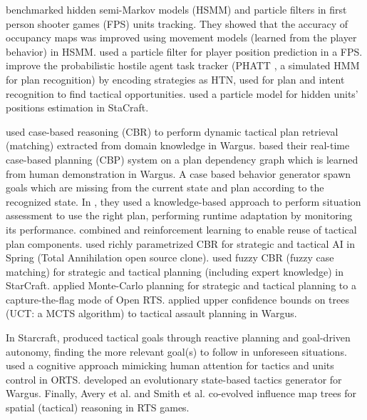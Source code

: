\cite{Hladky_anevaluation} benchmarked hidden semi-Markov models (HSMM) and particle filters in first person shooter games (FPS) units tracking. They showed that the accuracy of occupancy maps was improved using movement models (learned from the player behavior) in HSMM. \cite{particlefiltergameAI} used a particle filter for player position prediction in a FPS. \cite{Kabanza2010} improve the probabilistic hostile agent task tracker (PHATT \citep{PHATT}, a simulated HMM for plan recognition) by encoding strategies as HTN, used for plan and intent recognition to find tactical opportunities. \cite{weber2011aiide} used a particle model for hidden units' positions estimation in StaCraft.

\cite{LTW} used case-based reasoning (CBR) to perform dynamic tactical plan retrieval (matching) extracted from domain knowledge in Wargus. \cite{Ontanon2007} based their real-time case-based planning (CBP) system on a plan dependency graph which is learned from human demonstration in Wargus. A case based behavior generator spawn goals which are missing from the current state and plan according to the recognized state. In \citep{Mishra2008,metalevelbehavioradaptrts}, they used a knowledge-based approach to perform situation assessment to use the right plan, performing runtime adaptation by monitoring its performance. \cite{CBR-RL} combined  and reinforcement learning to enable reuse of tactical plan components. 
\cite{Bakkes09} used richly parametrized CBR for strategic and tactical AI in Spring (Total Annihilation open source clone). 
\cite{CadenaG11} used fuzzy CBR (fuzzy case matching) for strategic and tactical planning (including expert knowledge) in StarCraft. \cite{Chung05} applied Monte-Carlo planning for strategic and tactical planning to a capture-the-flag mode of Open RTS. \cite{UCT} applied upper confidence bounds on trees (UCT: a MCTS algorithm) to tactical assault planning in Wargus. 

In Starcraft, \cite{Weber2010cr,WeberCIG10} produced tactical goals through reactive planning and goal-driven autonomy, finding the more relevant goal(s) to follow in unforeseen situations. 
\cite{SORTS} used a cognitive approach mimicking human attention for tactics and units control in ORTS. \cite{PonsenMSA06} developed an evolutionary state-based tactics generator for Wargus. %
Finally, Avery et al. \cite{Avery09} and Smith et al. \cite{SmithCIG10} co-evolved influence map trees for spatial (tactical) reasoning in RTS games. 

